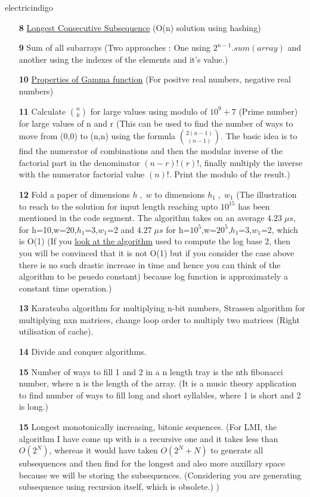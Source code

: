 \documentclass[12pt]{article}
\begin{document}
\begin{mybox}{electricindigo}{}
	\begin{itemize}
		\item[\textbf{8}] \href{https://www.geeksforgeeks.org/longest-consecutive-subsequence/}{Longest Consecutive Subsequence} (O(n) solution using hashing)
		\item[\textbf{9}] Sum of all subarrays (Two approaches : One using $2^{n-1}.sum(array)$ and another using the indexes of the elements and it's value.)
		\item[\textbf{10}] \href{http://www.jekyll.math.byuh.edu/courses/m321/handouts/gammaproperties.pdf}{Properties of Gamma function} (For positve real numbers, negative real numbers)
		\item[\textbf{11}] Calculate $n \choose k$ for large values using modulo of $10^9+7$ (Prime number) for large values of n and r (This can be used to find the number of ways to move from (0,0) to (n,n) using the formula $2(n-1) \choose (n-1)$. The basic idea is to find the numerator of combinations and then the modular inverse of the factorial part in the denominator $(n-r)!(r)!$, finally multiply the inverse with the numerator factorial value $(n)!$. Print the modulo of the result.)
		\item[\textbf{12}] Fold a paper of dimensions $h\;,\;w$ to dimensions $h_1\;,\;w_1$ (The illustration to reach to the solution for input length reaching upto $10^{15}$ has been mentioned in the code segment. The algorithm takes on an average $4.23\;{\mu}s$, for h=10,w=20,$h_1$=3,$w_1$=2 and $4.27\;{\mu}s$ for h=$10^5$,w=$20^5$,$h_1$=$3$,$w_1$=2, which is O(1) (If you \href{https://en.wikipedia.org/wiki/Binary_logarithm#Iterative_approximation}{look at the algorithm} used to compute the log base 2, then you will be convinced that it is not O(1) but if you consider the case above there is no such drastic increase in time and hence you can think of the algorithm to be psuedo constant) because log function is approximately a constant time operation.)
		\item[\textbf{13}] Karatsuba algorithm for multiplying n-bit numbers, Strassen algorithm for multiplying nxn matrices, change loop order to multiply two matrices (Right utilisation of cache).
		\item[\textbf{14}] Divide and conquer algorithms.
		\item[\textbf{15}] Number of ways to fill 1 and 2 in a n length tray is the nth fibonacci number, where n is the length of the array. (It is a music theory application to find number of ways to fill long and short syllables, where 1 is short and 2 is long.)
		\item[\textbf{15}] Longest monotonically increasing, bitonic sequences. (For LMI, the algorithm I have come up with is a recursive one and it takes less than $O(2^N)$, whereas it would have taken $O(2^{N}+N)$ to generate all subsequences and then find for the longest and also more auxillary space because we will be storing the subsequences. (Considering you are generating subsequence using recursion itself, which is obsolete.) )
	\end{itemize}
\end{mybox}
\end{document}
